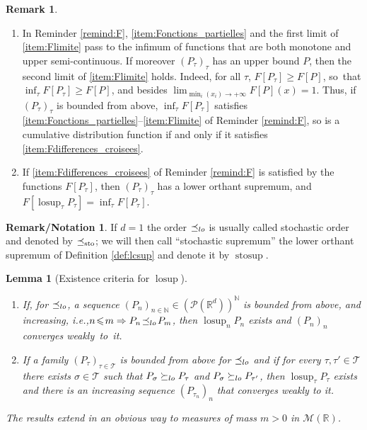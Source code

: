\documentclass[11pt]{article}
\newcommand{\ie}{i.e.,\xspace}
\newcommand{\skpt}{\smallskip}
\theoremstyle{plain}
\newtheorem{lem}[them]{Lemma}
\theoremstyle{definition}
\newtheorem{remnotation}[them]{Remark/Notation} %
\newtheorem{rem}[them]{Remark}
\newcommand{\Tt}{{\mathcal T}}
\newcommand{\p}{\mathcal{P}}
\newcommand{\m}{\mathcal{M}}
\newcommand{\R}{\mathbb{R}}
\newcommand{\N}{\mathbb{N}}
\newcommand{\stosup}{\operatorname{stosup}}
\newcommand{\lcsup}{\operatorname{losup}}
\newcommand{\leqs}{\preceq_{\text{\rm sto}}}
\newcommand{\leqlc}{\preceq_{\rm lo}}
\newcommand{\geqlc}{\succeq_{\rm lo}}
\begin{document}
\skpt
\begin{rem}\label{rem:lcsup}
\begin{enumerate}
\item
\label{p:lcsupa} In Reminder \ref{remind:F}, \eqref{item:Fonctions_partielles} and the first limit of \eqref{item:Flimite} pass to the infimum of functions that are both monotone and upper semi-continuous. If moreover $(P_\tau)_\tau$ has an upper bound $P$, then the second limit of \eqref{item:Flimite} holds. Indeed, for all $\tau$, $F[P_\tau]\geqslant F[P]$, so~that $\inf_\tau F[P_\tau]\geqslant F[P]$, and besides $\lim_{\min_i(x_i)\to+\infty}F[P](x)=1$. Thus, if $(P_\tau)_\tau$ is bounded from above, $\inf_\tau F[P_\tau]$ satisfies \eqref{item:Fonctions_partielles}--\eqref{item:Flimite} of Reminder \ref{remind:F}, so is a cumulative distribution function if and only if it satisfies \eqref{item:Fdifferences_croisees}.
\item
\label{p:lcsupb} If \eqref{item:Fdifferences_croisees} of Reminder \ref{remind:F} is satisfied by the functions $F[P_\tau]$, then $(P_\tau)_\tau$ has a lower orthant supremum, and $F[\lcsup_\tau P_\tau]=\inf_\tau F[P_\tau]$.
\end{enumerate}
\end{rem}

\begin{remnotation}\label{nota:stosup} If $d=1$ the order $\leqlc$ is usually called stochastic order and denoted by $\leqs$; we will then call ``stochastic supremum'' the lower orthant supremum of Definition \ref{def:lcsup} and denote it by $\stosup$.
\end{remnotation}

\skpt
\begin{lem}[Existence criteria for $\lcsup$]
\label{lem:sto_order}
\begin{enumerate}
\item
\label{item:suite_croissante_majoree} If, for $\leqlc$, a sequence $(P_n)_{n\in \N}\!\in\!(\p(\R^d))^\N$ is bounded from above, and increasing, \ie $n\!\leqslant\! m\Rightarrow P_{n}\!\leqlc\! P_{m}$, then $\lcsup_nP_n$ exists and $(P_n)_{n}$ converges weakly~to~it.

\item
\label{item:treillis} If a family $(P_\tau)_{\tau\in\Tt}$ is bounded from above for $\leqlc$ and if for every $\tau,\tau'\in \Tt$ there exists $\sigma\in \Tt$ such that $P_\sigma\geqlc P_\tau$ and $P_\sigma\geqlc P_{\tau'}$, then $\lcsup_\tau P_\tau$ exists and there is an increasing sequence $(P_{\tau_n})_n$
that converges weakly to it.
\end{enumerate}
The results extend in an obvious way to measures of mass $m>0$ in $\m(\R)$.
\end{lem}
\end{document}
